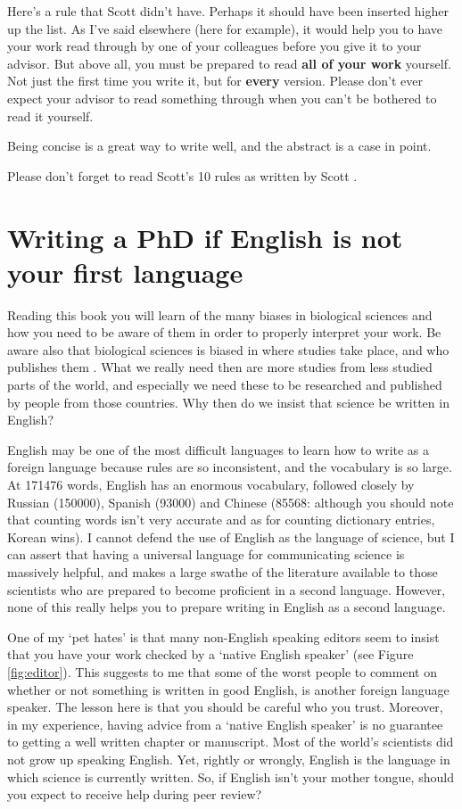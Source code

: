 \documentclass[
]{krantz}
\begin{document}
Here's a rule that Scott didn't have. Perhaps it should have been inserted higher up the list. As I've said elsewhere (here for example), it would help you to have your work read through by one of your colleagues before you give it to your advisor. But above all, you must be prepared to read \textbf{all of your work} yourself. Not just the first time you write it, but for \textbf{every} version. Please don't ever expect your advisor to read something through when you can't be bothered to read it yourself.

Being concise is a great way to write well, and the abstract is a case in point.

Please don't forget to read Scott's 10 rules as written by Scott \citep{hotaling2020simple}.

\hypertarget{foreign}{%
\section{Writing a PhD if English is not your first language}\label{foreign}}

Reading this book you will learn of the many biases in biological sciences and how you need to be aware of them in order to properly interpret your work. Be aware also that biological sciences is biased in where studies take place, and who publishes them \citep{culumber2019widespread, nunez2021monolingual}. What we really need then are more studies from less studied parts of the world, and especially we need these to be researched and published by people from those countries. Why then do we insist that science be written in English?

English may be one of the most difficult languages to learn how to write as a foreign language because rules are so inconsistent, and the vocabulary is so large. At 171476 words, English has an enormous vocabulary, followed closely by Russian (150000), Spanish (93000) and Chinese (85568: although you should note that counting words isn't very accurate and as for counting dictionary entries, Korean wins). I cannot defend the use of English as the language of science, but I can assert that having a universal language for communicating science is massively helpful, and makes a large swathe of the literature available to those scientists who are prepared to become proficient in a second language. However, none of this really helps you to prepare writing in English as a second language.

One of my `pet hates' is that many non-English speaking editors seem to insist that you have your work checked by a `native English speaker' (see Figure \ref{fig:editor}). This suggests to me that some of the worst people to comment on whether or not something is written in good English, is another foreign language speaker. The lesson here is that you should be careful who you trust. Moreover, in my experience, having advice from a `native English speaker' is no guarantee to getting a well written chapter or manuscript. Most of the world's scientists did not grow up speaking English. Yet, rightly or wrongly, English is the language in which science is currently written. So, if English isn't your mother tongue, should you expect to receive help during peer review?
\end{document}

